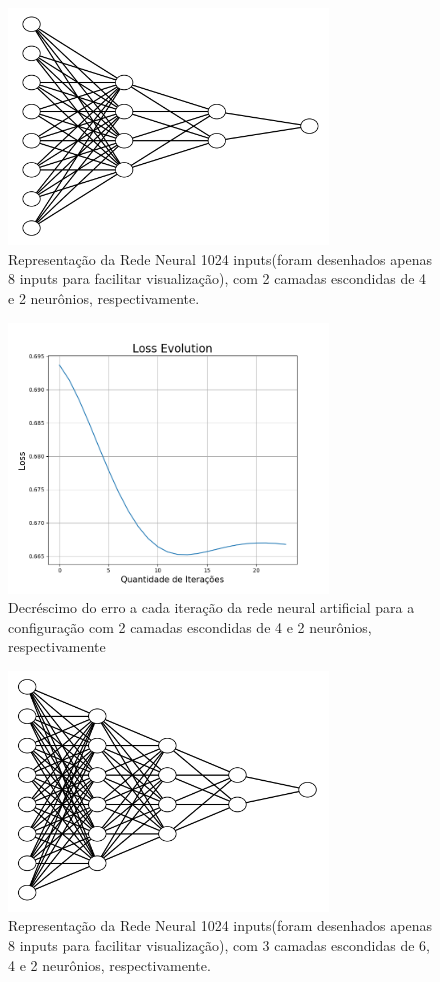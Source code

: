 \documentclass{article}
\begin{document}
\begin{figure}[ht]
\centering
\includegraphics[width=8.5cm]{rna_4_2}
\caption{Representação da Rede Neural 1024 inputs(foram desenhados apenas 8 inputs para facilitar visualização), com 2 camadas escondidas de 4 e 2 neurônios, respectivamente.}
\label{rna_4_2}
\end{figure}

\begin{figure}[ht]
\centering
\includegraphics[width=8.5cm]{rna_4_2_loss}
\caption{Decréscimo do erro a cada iteração da rede neural artificial para a configuração com 2 camadas escondidas de 4 e 2 neurônios, respectivamente}
\label{rna_4_2_loss}
\end{figure}

\begin{figure}[ht]
\centering
\includegraphics[width=8.5cm]{rna_6_4_2}
\caption{Representação da Rede Neural 1024 inputs(foram desenhados apenas 8 inputs para facilitar visualização), com 3 camadas escondidas de 6, 4 e 2 neurônios, respectivamente.}
\label{rna_6_4_2}
\end{figure}
\end{document}
